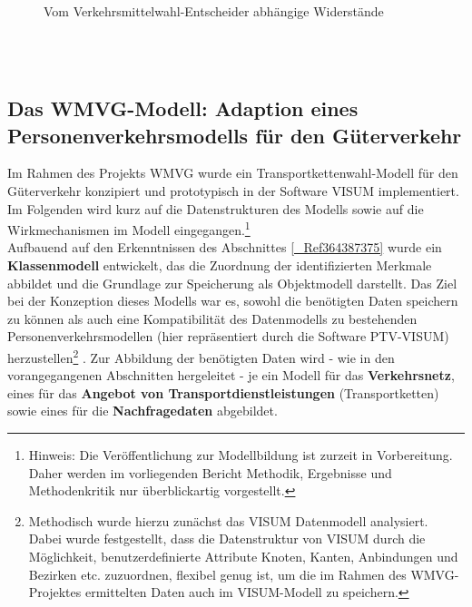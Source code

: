 \begin{figure}[htbp]
  \centering
  \caption{ Vom Verkehrsmittelwahl-Entscheider abhängige Widerstände}
  \label{_Ref333934772}
\end{figure}
~\\
~\\


% 
\subsection{Das WMVG-Modell: Adaption eines Personenverkehrsmodells für den Güterverkehr}
\label{_Toc366766116}
\label{_Toc366775310}
Im Rahmen des Projekts WMVG wurde ein Transportkettenwahl-Modell für den Güterverkehr konzipiert und prototypisch in der Software VISUM implementiert. Im Folgenden wird kurz auf die Datenstrukturen des Modells sowie auf die Wirkmechanismen im Modell eingegangen.\footnote{%
 Hinweis: Die Veröffentlichung zur Modellbildung ist zurzeit in Vorbereitung. Daher werden im vorliegenden Bericht Methodik, Ergebnisse und Methodenkritik nur überblickartig vorgestellt.
}%
~\\
Aufbauend auf den Erkenntnissen des Abschnittes \autoref{_Ref364387375}  wurde ein \textbf{Klassenmodell} entwickelt, das die Zuordnung der identifizierten Merkmale abbildet und die Grundlage zur Speicherung als Objektmodell darstellt. Das Ziel bei der Konzeption dieses Modells war es, sowohl die benötigten Daten speichern zu können als auch eine Kompatibilität des Datenmodells zu bestehenden Personenverkehrsmodellen (hier repräsentiert durch die Software PTV-VISUM) herzustellen\footnote{%
Methodisch wurde hierzu zunächst das VISUM Datenmodell analysiert. Dabei wurde festgestellt, dass die Datenstruktur von VISUM durch die Möglichkeit, benutzerdefinierte Attribute Knoten, Kanten, Anbindungen und Bezirken etc. zuzuordnen, flexibel genug ist, um die im Rahmen des WMVG-Projektes ermittelten Daten auch im VISUM-Modell zu speichern.
}%
. Zur Abbildung der benötigten Daten wird - wie in den vorangegangenen Abschnitten hergeleitet - je ein Modell für das \textbf{Verkehrsnetz}, eines für das \textbf{Angebot von Transportdienstleistungen} (Transportketten) sowie eines für die \textbf{Nachfragedaten} abgebildet. ~\\


% 
